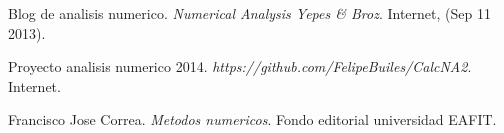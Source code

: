 \documentclass[11pt]{article}
\begin{document}
\begin{thebibliography}{9}
  Blog de analisis numerico.
  \textit{Numerical Analysis Yepes \& Broz}.
  Internet, (Sep 11 2013).

  Proyecto analisis numerico 2014.
  \textit{https://github.com/FelipeBuiles/CalcNA2}.
  Internet.

  Francisco Jose Correa.
  \textit{Metodos numericos}.
  Fondo editorial universidad EAFIT.
  
\end{thebibliography}
\end{document}
